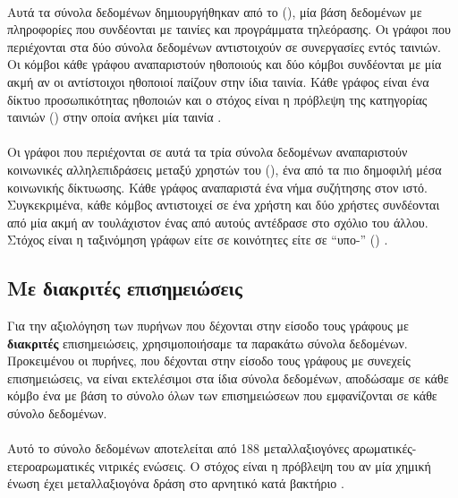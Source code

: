 \paragraph*{}
Αυτά τα σύνολα δεδομένων δημιουργήθηκαν από το  (), μία  βάση δεδομένων με πληροφορίες που συνδέονται με ταινίες και προγράμματα τηλεόρασης.
Οι γράφοι που περιέχονται στα δύο σύνολα δεδομένων αντιστοιχούν σε συνεργασίες εντός ταινιών.
Οι κόμβοι κάθε γράφου αναπαριστούν ηθοποιούς και δύο κόμβοι συνδέονται με μία ακμή αν οι αντίστοιχοι ηθοποιοί παίζουν στην ίδια ταινία.
Κάθε γράφος είναι ένα  δίκτυο προσωπικότητας ηθοποιών και ο στόχος είναι η πρόβλεψη της κατηγορίας ταινιών () στην οποία ανήκει μία ταινία \cite{DGK_PINAR}.

\paragraph*{}
Οι γράφοι που περιέχονται σε αυτά τα τρία σύνολα δεδομένων αναπαριστούν κοινωνικές αλληλεπιδράσεις μεταξύ χρηστών του  (), ένα από τα πιο δημοφιλή μέσα κοινωνικής δίκτυωσης.
Κάθε γράφος αναπαριστά ένα νήμα συζήτησης στον ιστό.
Συγκεκριμένα, κάθε κόμβος αντιστοιχεί σε ένα χρήστη και δύο χρήστες συνδέονται από μία ακμή αν τουλάχιστον ένας από αυτούς αντέδρασε στο σχόλιο του άλλου.
Στόχος είναι η ταξινόμηση γράφων είτε σε κοινότητες είτε σε ``υπο-'' () \cite{DGK_PINAR}.

\subsection{Με διακριτές επισημειώσεις}
\label{ssec:lab}
Για την αξιολόγηση των πυρήνων που δέχονται στην είσοδο τους γράφους με \textbf{διακριτές} επισημειώσεις, χρησιμοποιήσαμε τα παρακάτω σύνολα δεδομένων.
Προκειμένου οι πυρήνες, που δέχονται στην είσοδο τους γράφους με συνεχείς επισημειώσεις, να είναι εκτελέσιμοι στα ίδια σύνολα δεδομένων, αποδώσαμε σε κάθε κόμβο ένα  με βάση το σύνολο όλων των επισημειώσεων που εμφανίζονται σε κάθε σύνολο δεδομένων.
\paragraph*{} Αυτό το σύνολο δεδομένων αποτελείται από 188 μεταλλαξιογόνες αρωματικές-ετεροαρωματικές νιτρικές ενώσεις.
Ο στόχος είναι η πρόβλεψη του αν μία χημική ένωση έχει μεταλλαξιογόνα δράση στο αρνητικό κατά  βακτήριο  \cite{shervashidze2011weisfeiler}.

